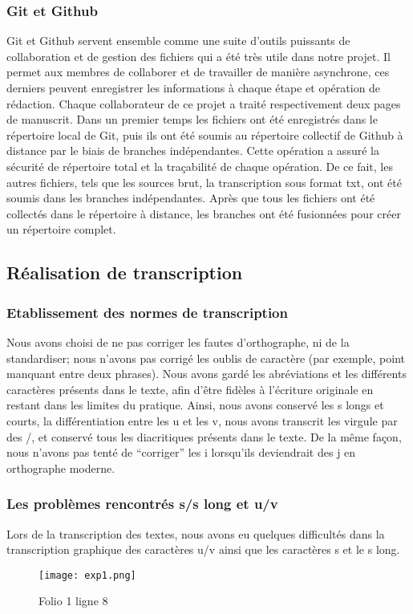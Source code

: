 \documentclass[12pt]{article}
\begin{document}
\subsubsection{Git et Github}

Git et Github servent ensemble comme une suite d’outils puissants de collaboration et de gestion des fichiers qui a été très utile dans notre projet. Il permet aux membres de collaborer et de travailler de manière asynchrone, ces derniers peuvent enregistrer les informations à chaque étape et opération de rédaction.
Chaque collaborateur de ce projet a traité respectivement deux pages de manuscrit. Dans un premier temps les fichiers ont été enregistrés dans le répertoire local de Git, puis ils ont été soumis au répertoire collectif de Github à distance par le biais de branches indépendantes. Cette opération a assuré la sécurité de répertoire total et la traçabilité de chaque opération. De ce fait, les autres fichiers, tels que les sources brut, la transcription sous format txt, ont été soumis dans les branches indépendantes. Après que tous les fichiers ont été collectés dans le répertoire à distance, les branches ont été fusionnées pour créer un répertoire complet.


\subsection{Réalisation de transcription}
\subsubsection{Etablissement des normes de transcription}
Nous avons choisi de ne pas corriger les fautes d’orthographe, ni de la standardiser; nous n’avons pas corrigé les oublis de caractère (par exemple, point manquant entre deux phrases). Nous avons gardé les abréviations et les différents caractères présents dans le texte, afin d’être fidèles à l’écriture originale en restant dans les limites du pratique. Ainsi, nous avons conservé les s longs et courts, la différentiation entre les u et les v, nous avons transcrit les virgule par des /, et conservé tous les diacritiques présents dans le texte. De la même façon, nous n’avons pas tenté de “corriger” les i lorsqu’ils deviendrait des j en orthographe moderne.


\subsubsection{Les problèmes rencontrés s/s long et u/v}
Lors de la transcription des textes, nous avons eu quelques difficultés dans la transcription graphique des caractères u/v ainsi que les caractères s et le s long. 
\begin{figure}
\centering
\texttt{[image: exp1.png]}
\caption{\label{exp1.png}Folio 1 ligne 8}
\end{figure}
\end{document}
